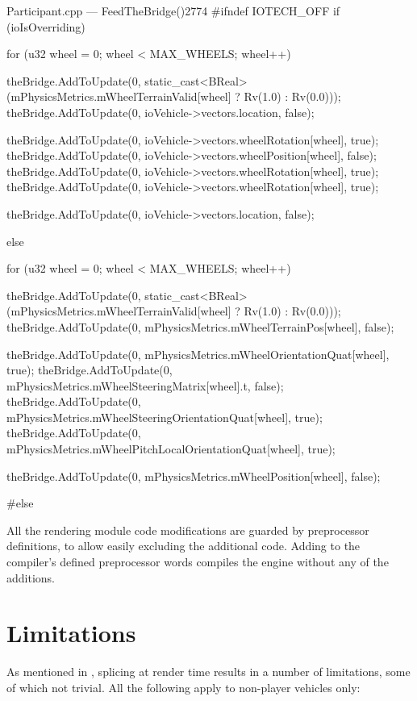 \begin{codelist}{Participant.cpp --- FeedTheBridge()}{2774}
#ifndef IOTECH_OFF
	if (ioIsOverriding) {
		for (u32 wheel = 0; wheel < MAX_WHEELS; wheel++) {
			theBridge.AddToUpdate(0, static_cast<BReal>(mPhysicsMetrics.mWheelTerrainValid[wheel] ? Rv(1.0) : Rv(0.0)));
			theBridge.AddToUpdate(0, ioVehicle->vectors.location, false);

			theBridge.AddToUpdate(0, ioVehicle->vectors.wheelRotation[wheel], true);
			theBridge.AddToUpdate(0, ioVehicle->vectors.wheelPosition[wheel], false);
			theBridge.AddToUpdate(0, ioVehicle->vectors.wheelRotation[wheel], true);
			theBridge.AddToUpdate(0, ioVehicle->vectors.wheelRotation[wheel], true);

			theBridge.AddToUpdate(0, ioVehicle->vectors.location, false);
		}
	}
	else {
		for (u32 wheel = 0; wheel < MAX_WHEELS; wheel++) {
			theBridge.AddToUpdate(0, static_cast<BReal>(mPhysicsMetrics.mWheelTerrainValid[wheel] ? Rv(1.0) : Rv(0.0)));
			theBridge.AddToUpdate(0, mPhysicsMetrics.mWheelTerrainPos[wheel], false);

			theBridge.AddToUpdate(0, mPhysicsMetrics.mWheelOrientationQuat[wheel], true);
			theBridge.AddToUpdate(0, mPhysicsMetrics.mWheelSteeringMatrix[wheel].t, false);
			theBridge.AddToUpdate(0, mPhysicsMetrics.mWheelSteeringOrientationQuat[wheel], true);
			theBridge.AddToUpdate(0, mPhysicsMetrics.mWheelPitchLocalOrientationQuat[wheel], true);

			theBridge.AddToUpdate(0, mPhysicsMetrics.mWheelPosition[wheel], false);
		}
	}
#else
\end{codelist}

All the rendering module code modifications are guarded by preprocessor definitions, to allow easily excluding the additional code. Adding  to the compiler's defined preprocessor words compiles the engine without any of the additions.

\section{Limitations}\label{sc:integration:limitations}

As mentioned in , splicing at render time results in a number of limitations, some of which not trivial. All the following apply to non-player vehicles only:

